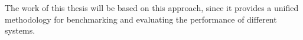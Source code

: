 The work of this thesis will be based on this approach, since it provides a unified methodology for benchmarking and evaluating the performance of different systems.


